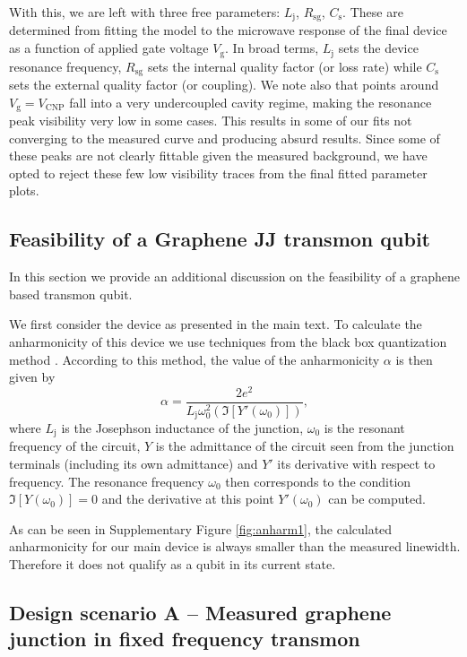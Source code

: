 With this, we are left with three free parameters: $L_\text{j}$, $R_\text{sg}$, $C_\text{s}$.
These are determined from fitting the model to the microwave response of the final device as a function of applied gate voltage $V_\text{g}$.
In broad terms, $L_\text{j}$ sets the device resonance frequency, $R_\text{sg}$ sets the internal quality factor (or loss rate) while $C_\text{s}$ sets the external quality factor (or coupling).
We note also that points around $V_\text{g} = V_\text{CNP}$ fall into a very undercoupled cavity regime, making the resonance peak visibility very low in some cases.
This results in some of our fits not converging to the measured curve and producing absurd results.
Since some of these peaks are not clearly fittable given the measured background, we have opted to reject these few low visibility traces from the final fitted parameter plots.

\subsection{Feasibility of a Graphene JJ transmon qubit}\label{sec:feasability}
\noindent In this section we provide an additional discussion on the feasibility of a graphene based transmon qubit.

We first consider the device as presented in the main text.
To calculate the anharmonicity of this device we use techniques from the black box quantization method \cite{niggBlackBoxSuperconductingCircuit2012}.
According to this method, the value of the anharmonicity $\alpha$ is then given by
\begin{equation}
\alpha = \frac{2e^2}{L_\text{j}\omega_0^2(\Im [Y'(\omega_0)])},
\end{equation}
where $L_\text{j}$ is the Josephson inductance of the junction, $\omega_0$ is the resonant frequency of the circuit, $Y$ is the admittance of the circuit seen from the junction terminals (including its own admittance) and $Y'$ its derivative with respect to frequency.
The resonance frequency $\omega_0$ then corresponds to the condition $\Im [Y(\omega_0)] = 0$ and the derivative at this point $Y'(\omega_0)$ can be computed.

As can be seen in Supplementary Figure \ref{fig:anharm1}, the calculated anharmonicity for our main device is always smaller than the measured linewidth.
Therefore it does not qualify as a qubit in its current state.



\subsection{Design scenario A -- Measured graphene junction in fixed frequency transmon}\label{sec:scenA}

